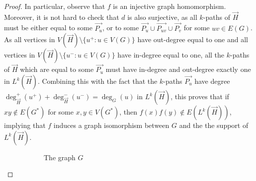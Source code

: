 \documentclass[11pt,a4aper]{article}
\DeclareRobustCommand*{\ora}{\overrightarrow}
\newcommand*{\orH}{\ora{H}}
\begin{document}
\begin{proof}
  In particular, observe that $f$ is an injective graph homomorphism. Moreover, it is not hard to check that $d$ is also surjective, as all $k$-paths of $\orH$ must be either equal to some $\ora{P_u}$, or to some $\ora{P_u}\cup \ora{P_{uv}}\cup\ora{P_v}$ for some $uv\in E(G)$. 
  As all
  vertices in $V(\orH) \setminus \{u^+ \colon u\in V(G)\}$ have out-degree equal to
  one and all vertices in $V(\orH) \setminus \{u^- \colon u\in V(G)\}$ have
  in-degree equal to one, all the $k$-paths of $\orH$ which are equal to some $\ora{P_u}$
  must have in-degree and out-degree exactly one in $L^k(\orH)$. Combining this with the fact that the
  $k$-paths $\ora{P_u}$ have degree $\deg_{\orH}^+(u^+) + \deg_{\orH}^-(u^-) = \deg_G(u)$ in $L^k(\orH)$, this
  proves that if $xy\notin E(G^{\ast})$ for some $x,y\in V(G^{\ast})$, then $f(x)f(y)\notin E(L^k(\orH))$, implying that $f$ induces a graph isomorphism between $G$ and the the support of $L^{k}(\orH)$.
%   
  
  \begin{figure}[h!]
    \centering
    \begin{subfigure}[t]{.3\textwidth}
      \centering
      \caption{The graph $G$}
    \end{subfigure}
    \hfill
    \begin{subfigure}[t]{.65\textwidth}\centering
\end{subfigure}
\end{figure}
\end{proof}
\end{document}
